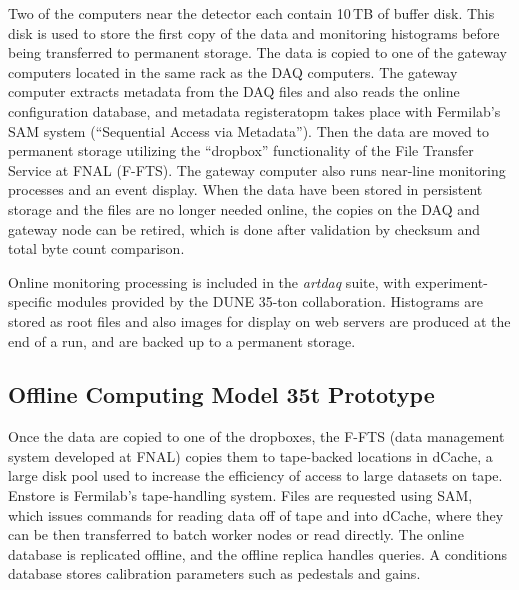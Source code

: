 Two of the computers near the detector each contain 10\,TB of buffer disk.  This disk is used to store the first copy of
the data and monitoring histograms before being transferred to permanent storage. The data is copied
to one of the gateway computers located in the same rack as the DAQ computers.  The gateway computer
extracts metadata from the DAQ files and also reads the online configuration database, and 
metadata registeratopm takes place with Fermilab's  SAM system (``Sequential Access via Metadata'').
Then the data are moved to permanent storage utilizing the ``dropbox'' functionality of the File Transfer Service at FNAL (F-FTS).
The gateway computer also runs near-line monitoring processes and an event display.
When the data have been stored in persistent storage and the files are no longer needed online,
the copies on the DAQ and gateway node can be retired, which is done after validation by checksum and
total byte count comparison.

Online monitoring processing is included in the {\it artdaq} suite, with experiment-specific modules
provided by the DUNE 35-ton collaboration.  Histograms are stored as root files and also
images for display on web servers are produced at the end of a run, and are backed up
to a permanent storage.


\subsection{Offline Computing Model 35t Prototype}

Once the data are copied to one of the dropboxes, the F-FTS (data management system developed at FNAL)
copies them to tape-backed locations in dCache,
a large disk pool used to increase the efficiency of access to large datasets on tape.  Enstore is Fermilab's
tape-handling system.  Files are requested using SAM, which issues commands for reading data off of tape
and into dCache, where they can be then transferred to batch worker nodes or read directly.  
The online database is replicated offline, and the offline replica handles queries.  A conditions database
stores calibration parameters such as pedestals and gains.


